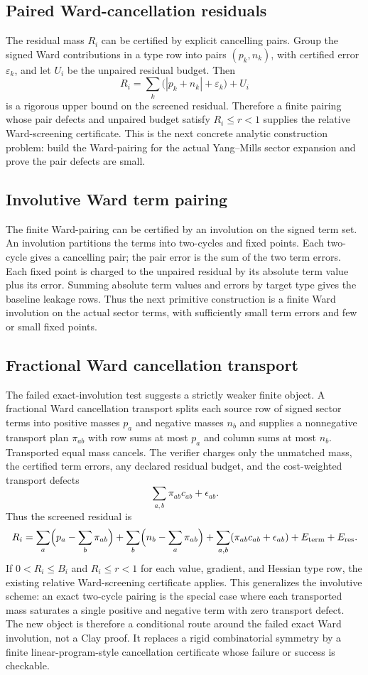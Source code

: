 \subsection{Paired Ward-cancellation residuals}
The residual mass \(R_i\) can be certified by explicit cancelling pairs. Group
the signed Ward contributions in a type row into pairs \((p_k,n_k)\), with
certified error \(\varepsilon_k\), and let \(U_i\) be the unpaired residual
budget. Then
\[
  R_i=\sum_k \bigl(|p_k+n_k|+\varepsilon_k\bigr)+U_i
\]
is a rigorous upper bound on the screened residual. Therefore a finite
pairing whose pair defects and unpaired budget satisfy \(R_i\le r<1\) supplies
the relative Ward-screening certificate. This is the next concrete analytic
construction problem: build the Ward-pairing for the actual Yang--Mills sector
expansion and prove the pair defects are small.

\subsection{Involutive Ward term pairing}
The finite Ward-pairing can be certified by an involution on the signed term
set. An involution partitions the terms into two-cycles and fixed points. Each
two-cycle gives a cancelling pair; the pair error is the sum of the two term
errors. Each fixed point is charged to the unpaired residual by its absolute
term value plus its error. Summing absolute term values and errors by target
type gives the baseline leakage rows. Thus the next primitive construction is
a finite Ward involution on the actual sector terms, with sufficiently small
term errors and few or small fixed points.

\subsection{Fractional Ward cancellation transport}
The failed exact-involution test suggests a strictly weaker finite object.  A
fractional Ward cancellation transport splits each source row of signed sector
terms into positive masses $p_a$ and negative masses $n_b$ and supplies a
nonnegative transport plan $\pi_{ab}$ with row sums at most $p_a$ and column
sums at most $n_b$.  Transported equal mass cancels.  The verifier charges only
the unmatched mass, the certified term errors, any declared residual budget,
and the cost-weighted transport defects
\[
        \sum_{a,b}\pi_{ab}c_{ab}+\epsilon_{ab}.
\]
Thus the screened residual is
\[
 R_i =
 \sum_a\Bigl(p_a-\sum_b\pi_{ab}\Bigr)
 +\sum_b\Bigl(n_b-\sum_a\pi_{ab}\Bigr)
 +\sum_{a,b}(\pi_{ab}c_{ab}+\epsilon_{ab})
 + E_{\rm term}+E_{\rm res}.
\]
If $0<R_i\le B_i$ and $R_i\le r<1$ for each value, gradient, and Hessian type
row, the existing relative Ward-screening certificate applies.  This
generalizes the involutive scheme: an exact two-cycle pairing is the special
case where each transported mass saturates a single positive and negative term
with zero transport defect.  The new object is therefore a conditional route
around the failed exact Ward involution, not a Clay proof.  It replaces a
rigid combinatorial symmetry by a finite linear-program-style cancellation
certificate whose failure or success is checkable.

